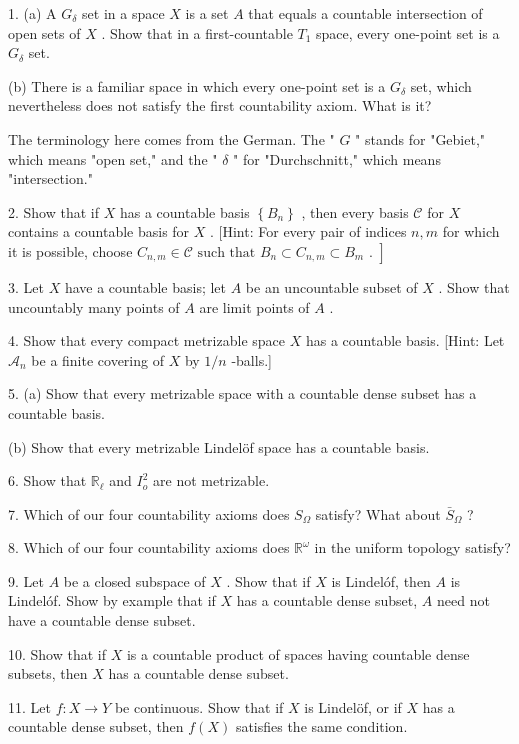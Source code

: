 1. (a) A \({G}_{\delta }\) set in a space \(X\) is a set \(A\) that equals a countable intersection of open sets of \(X\) . Show that in a first-countable \({T}_{1}\) space, every one-point set is a \({G}_{\delta }\) set.

(b) There is a familiar space in which every one-point set is a \({G}_{\delta }\) set, which nevertheless does not satisfy the first countability axiom. What is it?

The terminology here comes from the German. The " \(G\) " stands for "Gebiet," which means "open set," and the " \(\delta\) " for "Durchschnitt," which means "intersection."

2. Show that if \(X\) has a countable basis \(\left\{  {B}_{n}\right\}\) , then every basis \(\mathcal{C}\) for \(X\) contains a countable basis for \(X\) . [Hint: For every pair of indices \(n,m\) for which it is possible, choose \(\left. {{C}_{n,m} \in  \mathcal{C}\text{ such that }{B}_{n} \subset  {C}_{n,m} \subset  {B}_{m}\text{ . }}\right\rbrack\)

3. Let \(X\) have a countable basis; let \(A\) be an uncountable subset of \(X\) . Show that uncountably many points of \(A\) are limit points of \(A\) .

4. Show that every compact metrizable space \(X\) has a countable basis. [Hint: Let \({\mathcal{A}}_{n}\) be a finite covering of \(X\) by \(1/n\) -balls.]

5. (a) Show that every metrizable space with a countable dense subset has a countable basis.

(b) Show that every metrizable Lindelöf space has a countable basis.

6. Show that \({\mathbb{R}}_{\ell }\) and \({I}_{o}^{2}\) are not metrizable.

7. Which of our four countability axioms does \({S}_{\Omega }\) satisfy? What about \({\bar{S}}_{\Omega }\) ?

8. Which of our four countability axioms does \({\mathbb{R}}^{\omega }\) in the uniform topology satisfy?

9. Let \(A\) be a closed subspace of \(X\) . Show that if \(X\) is Lindelóf, then \(A\) is Lindelóf. Show by example that if \(X\) has a countable dense subset, \(A\) need not have a countable dense subset.

10. Show that if \(X\) is a countable product of spaces having countable dense subsets, then \(X\) has a countable dense subset.

11. Let \(f : X \rightarrow  Y\) be continuous. Show that if \(X\) is Lindelöf, or if \(X\) has a countable dense subset, then \(f\left( X\right)\) satisfies the same condition.

